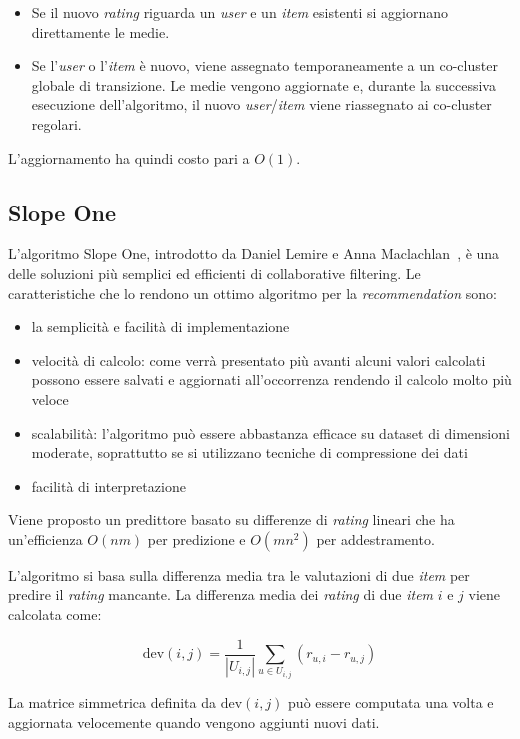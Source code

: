 \begin{itemize}
  \item Se il nuovo \textit{rating} riguarda un \textit{user} e un \textit{item} esistenti si aggiornano direttamente le medie.
  \item Se l'\textit{user} o l'\textit{item} è nuovo, viene assegnato temporaneamente a un co-cluster globale di transizione. Le medie vengono aggiornate e, durante la successiva esecuzione dell'algoritmo, il nuovo \textit{user}/\textit{item} viene riassegnato ai co-cluster regolari.
\end{itemize}

L'aggiornamento ha quindi costo pari a $O(1)$.

\subsection{Slope One}\label{slopeone}

L'algoritmo Slope One, introdotto da Daniel Lemire e Anna Maclachlan~\cite{SlopeOne}, è una delle soluzioni più semplici ed efficienti di collaborative filtering.
%
Le caratteristiche che lo rendono un ottimo algoritmo per la \textit{recommendation} sono:
\begin{itemize}
    \item la semplicità e facilità di implementazione
    \item velocità di calcolo: come verrà presentato più avanti alcuni valori calcolati possono essere salvati e aggiornati all'occorrenza rendendo il calcolo molto più veloce
    \item scalabilità: l'algoritmo può essere abbastanza efficace su dataset di dimensioni moderate, soprattutto se si utilizzano tecniche di compressione dei dati
    \item facilità di interpretazione
\end{itemize}
%
Viene proposto un predittore basato su differenze di \textit{rating} lineari che ha un'efficienza $O(nm)$ per predizione e $O(mn^2)$ per addestramento.

L'algoritmo si basa sulla differenza media tra le valutazioni di due \textit{item} per predire il \textit{rating} mancante. La differenza media dei \textit{rating} di due \textit{item} $i$ e $j$ viene calcolata come:

\[
    \text{dev}(i, j) = \frac{1}{|U_{i,j}|} \sum\limits_{u \in U_{i,j}} (r_{u,i} - r_{u,j})
\]

La matrice simmetrica definita da $\text{dev}(i, j)$ può essere computata una volta e aggiornata velocemente quando vengono aggiunti nuovi dati.

